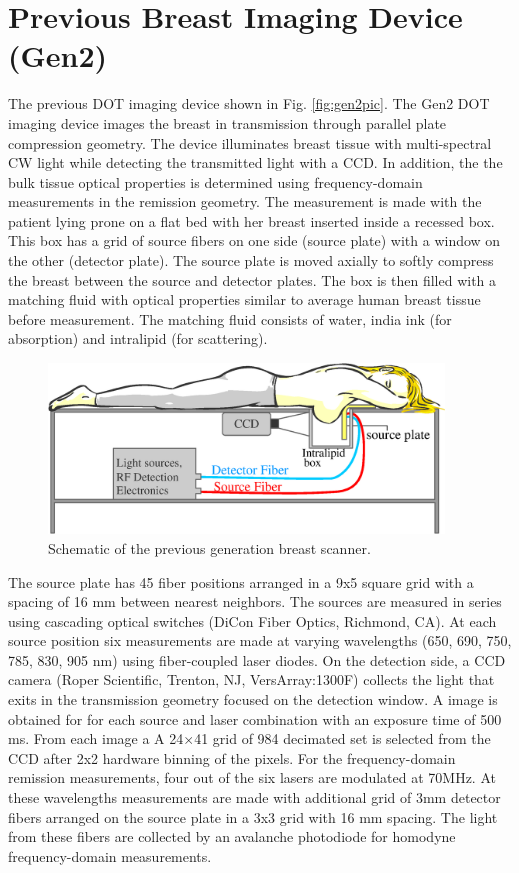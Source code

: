 \section{Previous Breast Imaging Device (Gen2)}
The previous DOT imaging device shown in Fig. \ref{fig:gen2pic}. The Gen2 DOT imaging device images the breast in transmission through parallel plate compression geometry. The device illuminates breast tissue with multi-spectral CW light while detecting the transmitted light with a CCD. In addition, the the bulk tissue optical properties is determined using frequency-domain measurements in the remission geometry. The measurement is made with the patient lying prone on a flat bed with her breast inserted inside a recessed box. This box has a grid of source fibers on one side (source plate) with a window on the other (detector plate). The source plate is moved axially to softly compress the breast between the source and detector plates. The box is then filled with a matching fluid with optical properties similar to average human breast tissue before measurement. The matching fluid consists of water, india ink (for absorption) and intralipid (for scattering).
\begin{figure}[ht]
\begin{center}
\includegraphics[width=10.5cm]{./figures/4_Gen3/gen2schem.eps}
\caption{Schematic of the previous generation breast scanner.}
\label{fig:gen2schem}
\end{center}
\end{figure}
The source plate has 45 fiber positions arranged in a 9x5 square grid with a spacing of 16 mm between nearest neighbors. The sources are measured in series using cascading optical switches (DiCon Fiber Optics, Richmond, CA). At each source position six measurements are made at varying wavelengths (650, 690, 750, 785, 830, 905 nm) using fiber-coupled laser diodes. On the detection side, a CCD camera (Roper Scientific, Trenton, NJ, VersArray:1300F) collects the light that exits in the transmission geometry focused on the detection window. A image is obtained for for each source and laser combination with an exposure time of 500 ms. From each image a  A 24$\times$41 grid of 984  decimated set is selected from the CCD after 2x2 hardware binning of the pixels. For the frequency-domain remission measurements, four out of the six lasers are modulated at 70MHz. At these wavelengths measurements are made with additional grid of 3mm detector fibers arranged on the source plate in a 3x3 grid with 16 mm spacing. The light from these fibers are collected by an avalanche photodiode for homodyne frequency-domain measurements.

